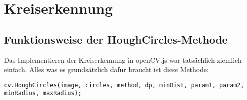 \section{Kreiserkennung}

\subsection{Funktionsweise der HoughCircles-Methode}
Das Implementieren der Kreiserkennung in openCV.js war tatsächlich ziemlich einfach. Alles was es grundsätzlich dafür braucht ist diese Methode:

\begin{lstlisting}[style=JavaScript]
cv.HoughCircles(image, circles, method, dp, minDist, param1, param2, minRadius, maxRadius);
\end{lstlisting}

